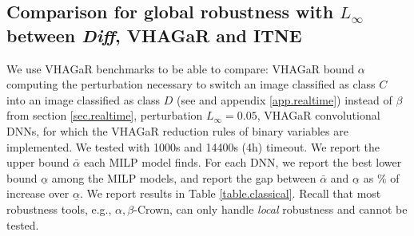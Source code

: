 \subsection{Comparison for global robustness with $L_\infty$ between {\em Diff}, VHAGaR and ITNE}

We use VHAGaR benchmarks to be able to compare: 
VHAGaR bound $\alpha$ 
computing the perturbation necessary to switch an image classified as class $C$ into an image classified as class $D$ (see \cite{vhagar} and appendix \ref{app.realtime}) instead of $\beta$ from section \ref{sec.realtime}, perturbation 
$L_\infty=0.05$, VHAGaR convolutional DNNs, for which the VHAGaR reduction rules of binary variables are implemented. 
We tested with 1000s and 14400s (4h) timeout. We report the upper bound $\bar{\alpha}$ each MILP model finds. For each DNN, we report the best lower bound $\underline{\alpha}$ among the MILP models, and report the gap between $\bar{\alpha}$ and  $\underline{\alpha}$ as $\%$ of increase over $\underline{\alpha}$. We report results in Table \ref{table.classical}. Recall that most robustness tools, e.g., $\alpha,\beta$-Crown, can only handle {\em local} robustness and cannot be tested.

\iffalse

